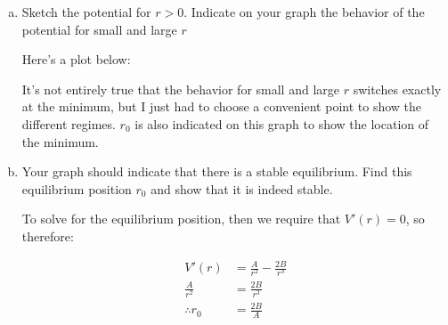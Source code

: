 \documentclass[10pt]{article}
\begin{document}
    \begin{enumerate}[(a)]
        \item Sketch the potential for $r > 0$. Indicate on your graph the behavior of the potential for small and large $r$
        
        \begin{solution}
            Here's a plot below: 

            \begin{center}
            \end{center}

            It's not entirely true that the behavior for small and large $r$ switches exactly at the minimum, but I just had to choose a convenient point to show the different regimes. $r_0$ is also indicated on this graph to show the location of the minimum. 
        \end{solution}
        \item Your graph should indicate that there is a stable equilibrium. Find this equilibrium position $r_0$ and show that it is indeed stable. 
        
        \begin{solution}
            To solve for the equilibrium position, then we require that $V'(r) = 0$, so therefore: 

            \begin{align*}
                V'(r) &= \frac{A}{r^2} - \frac{2B}{r^3}\\
                \frac{A}{r^2} &= \frac{2B}{r^3}\\
                \therefore r_0 &= \frac{2B}{A}
            \end{align*}


\end{solution}
\end{enumerate}
\end{document}
